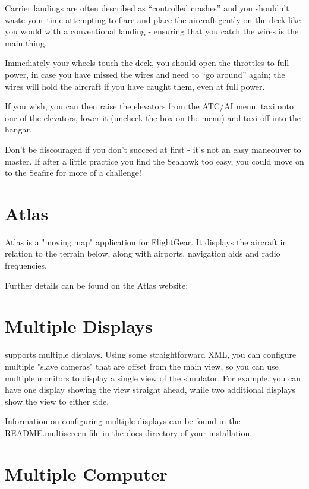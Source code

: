 Carrier landings are often described as ``controlled crashes'' and you shouldn't waste your time attempting
to flare and place the aircraft gently on the deck like you would with a conventional landing - ensuring that
you catch the wires is the main thing.

Immediately your wheels touch the deck, you should open the throttles to full power, in case you have
missed the wires and need to ``go around'' again; the wires will hold the aircraft if you have caught them,
even at full power.

If you wish, you can then raise the elevators from the ATC/AI menu, taxi onto one of the elevators,
lower it (uncheck the box on the menu) and taxi off into the hangar.

Don't be discouraged if you don't succeed at first - it's not an easy maneouver to master. If after a little
practice you find the Seahawk too easy, you could move on to the Seafire for more of a challenge!


\section{Atlas\label{Atlas}}

Atlas is a "moving map" application for FlightGear. It displays the aircraft in relation to the terrain below,
along with airports, navigation aids and radio frequencies.

Further details can be found on the Atlas website:

\noindent
{}

\section{Multiple Displays}

\FlightGear{} supports multiple displays. Using some straightforward
 XML, you can configure multiple "slave cameras" that are offset from
the main view, so you can use multiple monitors to display a
single view of the simulator. For example, you can have one display
showing the view straight ahead, while two additional displays show
the view to either side.

Information on configuring multiple displays can be found in the
README.multiscreen file in the docs directory of your \FlightGear{}
installation.

\section{Multiple Computer}

